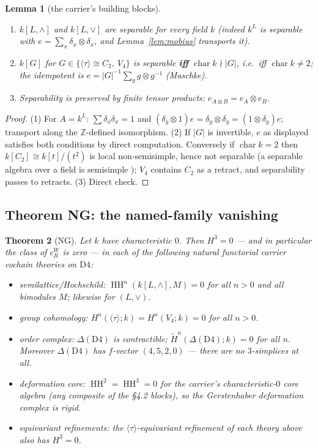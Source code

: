 \documentclass[11pt]{article}
\newtheorem{theorem}{Theorem}[section]
\newtheorem{lemma}[theorem]{Lemma}
\theoremstyle{definition}
\theoremstyle{remark}
\newcommand{\Z}{\mathbb{Z}}
\newcommand{\Dfour}{\mathrm{D4}}
\newcommand{\HH}{\operatorname{HH}}
\newcommand{\cR}{c_R^W}
\begin{document}
\begin{lemma}[the carrier's building blocks]\label{lem:blocks}
\begin{enumerate}
\item $k[L,\wedge]$ and $k[L,\vee]$ are separable for every field $k$ (indeed $k^L$ is separable with $e=\sum_x\delta_x\otimes\delta_x$, and Lemma~\ref{lem:mobius} transports it).
\item $k[G]$ for $G\in\{\langle\tau\rangle\cong C_2,\ V_4\}$ is separable \textbf{iff} $\operatorname{char}k\nmid|G|$, i.e.\ iff $\operatorname{char}k\ne2$; the idempotent is $e=|G|^{-1}\sum_g g\otimes g^{-1}$ (Maschke).
\item Separability is preserved by finite tensor products: $e_{A\otimes B}=e_A\otimes e_B$.
\end{enumerate}
\end{lemma}

\begin{proof}
(1) For $A=k^L$: $\sum\delta_x\delta_x=1$ and $(\delta_y\otimes1)e=\delta_y\otimes\delta_y=(1\otimes\delta_y)e$; transport along the $\Z$-defined isomorphism. (2) If $|G|$ is invertible, $e$ as displayed satisfies both conditions by direct computation. Conversely if $\operatorname{char}k=2$ then $k[C_2]\cong k[t]/(t^2)$ is local non-semisimple, hence not separable (a separable algebra over a field is semisimple \cite{demeyer}); $V_4$ contains $C_2$ as a retract, and separability passes to retracts. (3) Direct check.
\end{proof}

\subsection{Theorem NG: the named-family vanishing}

\begin{theorem}[NG]\label{thm:ng}
Let $k$ have characteristic $0$. Then $H^3=0$ --- and in particular the class of $\cR$ is zero --- in each of the following natural functorial carrier cochain theories on $\Dfour$:
\begin{itemize}
\item[\emph{(B)}] \emph{semilattice/Hochschild:} $\HH^n(k[L,\wedge],M)=0$ for all $n>0$ and all bimodules $M$; likewise for $(L,\vee)$.
\item[\emph{(G)}] \emph{group cohomology:} $H^n(\langle\tau\rangle;k)=H^n(V_4;k)=0$ for all $n>0$.
\item[\emph{(O)}] \emph{order complex:} $\Delta(\Dfour)$ is contractible; $\widetilde H^n(\Delta(\Dfour);k)=0$ for all $n$. Moreover $\Delta(\Dfour)$ has $f$-vector $(4,5,2,0)$ --- there are no $3$-simplices at all.
\item[\emph{(Op)}] \emph{deformation core:} $\HH^2=\HH^3=0$ for the carrier's characteristic-$0$ core algebra (any composite of the \S4.2 blocks), so the Gerstenhaber deformation complex \cite{gerst1,gerst2} is rigid.
\item[\emph{($\tau$)}] \emph{equivariant refinements:} the $\langle\tau\rangle$-equivariant refinement of each theory above also has $H^3=0$.
\end{itemize}
\end{theorem}
\end{document}

